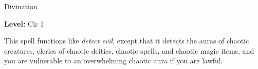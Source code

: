 
Divination

\textbf{Level:} Clr 1

This spell functions like \textit{detect evil}, except that it detects the auras 
of chaotic creatures, clerics of chaotic deities, chaotic spells, and chaotic magic 
items, and you are vulnerable to an overwhelming chaotic aura if you are lawful.

